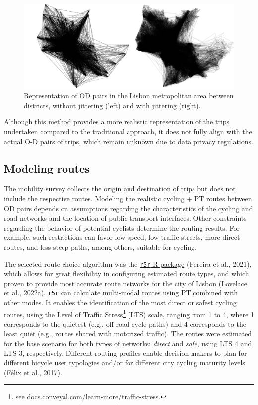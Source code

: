 \documentclass[review, doubleblind, 3p,
authoryear]{elsarticle} %
\begin{document}
\begin{figure}

{\centering \includegraphics[width=1\linewidth,]{img/jitter} 

}

\caption{Representation of OD pairs in the Lisbon metropolitan area between districts, without jittering (left) and with jittering (right).}\label{fig:jitter}
\end{figure}

Although this method provides a more realistic representation of the
trips undertaken compared to the traditional approach, it does not fully
align with the actual O-D pairs of trips, which remain unknown due to
data privacy regulations.

\hypertarget{modeling-routes}{%
\subsection{Modeling routes}\label{modeling-routes}}

The mobility survey collects the origin and destination of trips but
does not include the respective routes. Modeling the realistic cycling +
PT routes between OD pairs depends on assumptions regarding the
characteristics of the cycling and road networks and the location of
public transport interfaces. Other constraints regarding the behavior of
potential cyclists determine the routing results. For example, such
restrictions can favor low speed, low traffic streets, more direct
routes, and less steep paths, among others, suitable for cycling.

The selected route choice algorithm was the
\href{https://ipeagit.github.io/r5r/}{\texttt{r5r} R package} (Pereira
et al., 2021), which allows for great flexibility in configuring
estimated route types, and which proven to provide most accurate route
networks for the city of Lisbon (Lovelace et al., 2022a). \texttt{r5r}
can calculate multi-modal routes using PT combined with other modes. It
enables the identification of the most direct or safest cycling routes,
using the Level of Traffic Stress\footnote{see
  \href{https://docs.conveyal.com/learn-more/traffic-stress}{docs.conveyal.com/learn-more/traffic-stress}.}
(LTS) scale, ranging from 1 to 4, where 1 corresponds to the quietest
(e.g., off-road cycle paths) and 4 corresponds to the least quiet (e.g.,
routes shared with motorized traffic). The routes were estimated for the
base scenario for both types of networks: \emph{direct} and \emph{safe},
using LTS 4 and LTS 3, respectively. Different routing profiles enable
decision-makers to plan for different bicycle user typologies and/or for
different city cycling maturity levels (Félix et al., 2017).
\end{document}
